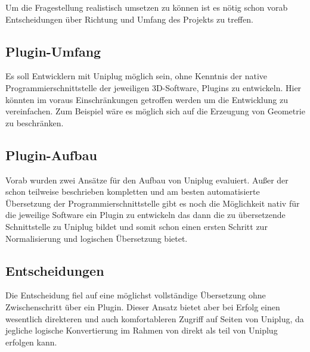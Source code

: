  \label{sec:Vorüberlegungen}

Um die Fragestellung realistisch umsetzen zu können ist es nötig schon vorab Entscheidungen über Richtung und Umfang des Projekts zu treffen.

\subsection{Plugin-Umfang}
Es soll Entwicklern mit Uniplug möglich sein, ohne Kenntnis der native Programmierschnittstelle der jeweiligen 3D-Software, Plugins zu entwickeln. Hier könnten im voraus Einschränkungen getroffen werden um die Entwicklung zu vereinfachen. Zum Beispiel wäre es möglich sich auf die Erzeugung von Geometrie zu beschränken.

\subsection{Plugin-Aufbau}
Vorab wurden zwei Ansätze für den Aufbau von Uniplug evaluiert. Außer der schon teilweise beschrieben kompletten und am besten automatisierte Übersetzung der Programmierschnittstelle gibt es noch die Möglichkeit nativ für die jeweilige Software ein Plugin zu entwickeln das dann die zu übersetzende Schnittstelle zu Uniplug bildet und somit schon einen ersten Schritt zur Normalisierung und logischen Übersetzung bietet.

\subsection{Entscheidungen}
Die Entscheidung fiel auf eine möglichst vollständige Übersetzung ohne Zwischenschritt über ein Plugin. Dieser Ansatz bietet aber bei Erfolg einen wesentlich direkteren und auch komfortableren Zugriff auf Seiten von Uniplug, da jegliche logische Konvertierung im Rahmen von \CS direkt als teil von Uniplug erfolgen kann.

